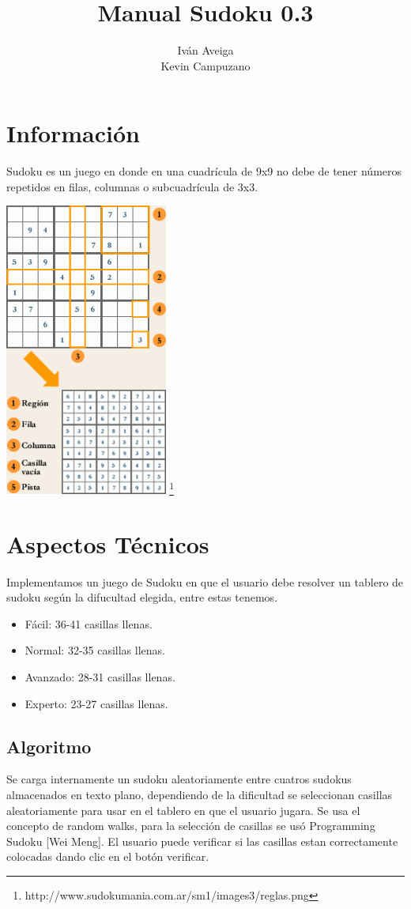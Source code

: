 \documentclass[a4paper,11pt]{article}
\title{Manual Sudoku 0.3}
\author{Iván Aveiga \\ Kevin Campuzano}
\begin{document}
\maketitle


\newpage

\section{Información}
	Sudoku es un juego en donde en una cuadrícula de 9x9 no debe de tener números repetidos en filas, columnas o subcuadrícula de 3x3.
	
	\begin{center}
		\includegraphics[width = 0.4\textwidth]{reglas.png} \footnote{http://www.sudokumania.com.ar/sm1/images3/reglas.png}
	\end{center}

\section{Aspectos Técnicos}
	Implementamos un juego de Sudoku en que el usuario debe resolver un tablero de sudoku según la difucultad elegida, entre estas tenemos.
	\begin{itemize}
		\item Fácil: 36-41 casillas llenas.
		\item Normal: 32-35 casillas llenas.
		\item Avanzado: 28-31 casillas llenas.
		\item Experto: 23-27 casillas llenas.
	\end{itemize}
	 
	 \subsection{Algoritmo}
	 	Se carga internamente un sudoku aleatoriamente entre cuatros sudokus almacenados en texto plano, dependiendo de la dificultad se seleccionan casillas aleatoriamente para usar en el tablero en que el usuario jugara. Se usa el concepto de random walks, para la selección de casillas se usó Programming Sudoku [Wei Meng].
		El usuario puede verificar si las casillas estan correctamente colocadas dando clic en el botón verificar.
\end{document}
